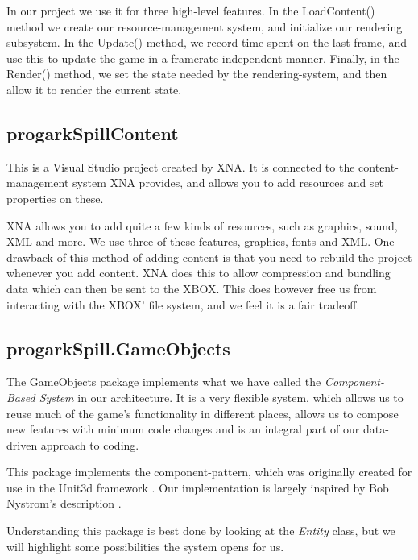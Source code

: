 In our project we use it for three high-level features. In the LoadContent()
method we create our resource-management system, and initialize our rendering
subsystem.  In the Update() method, we record time spent on the last frame, and
use this to update the game in a framerate-independent manner. Finally, in the
Render() method, we set the state needed by the rendering-system, and then
allow it to render the current state.

\subsection{progarkSpillContent}
This is a Visual Studio project created by XNA.  It is connected to the
content-management system XNA provides, and allows you to add resources and set
properties on these.

XNA allows you to add quite a few kinds of resources, such as graphics, sound, 
XML and more. We use three of these features, graphics, fonts and XML. One
drawback of this method of adding content is that you need to rebuild the
project whenever you add content. XNA does this to allow compression and 
bundling data which can then be sent to the XBOX. This does however free us
from interacting with the XBOX' file system, and we feel it is a fair tradeoff.

\subsection{progarkSpill.GameObjects}
The GameObjects package implements what we have called the 
\emph{Component-Based System} in our architecture. It is a very flexible 
system, which allows
us to reuse much of the game's functionality in different places, allows us
to compose new features with minimum code changes and is an integral part of
our data-driven approach to coding.

This package implements the component-pattern, which was originally created
for use in the Unit3d framework \cite{unity}. Our implementation is largely
inspired by Bob Nystrom's description \cite{component}.

Understanding this package is best done by looking at the \emph{Entity} class,
but we will highlight some possibilities the system opens for us.


